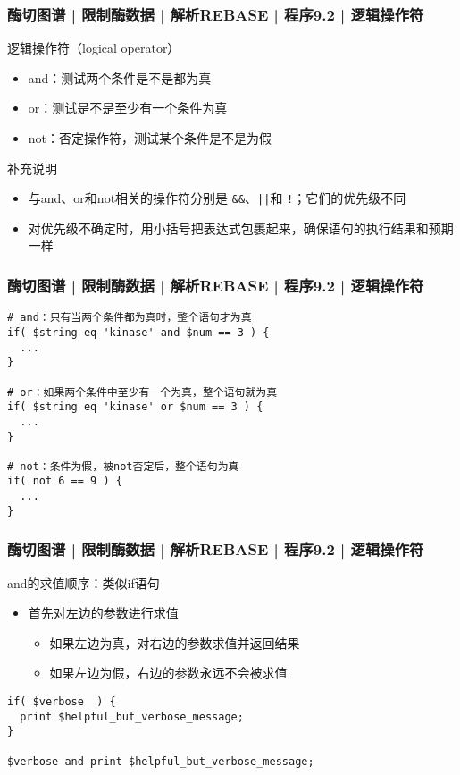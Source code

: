 \begin{frame}[fragile]
  \frametitle{酶切图谱 | 限制酶数据 | 解析REBASE | 程序9.2 | \alert{逻辑操作符}}
  \begin{block}{逻辑操作符（logical operator）}
    \begin{itemize}
      \item and：测试两个条件是不是都为真
      \item or：测试是不是至少有一个条件为真
      \item not：否定操作符，测试某个条件是不是为假
    \end{itemize}
  \end{block}
  \pause
  \begin{block}{补充说明}
    \begin{itemize}
      \item 与and、or和not相关的操作符分别是 \verb|&&|、\verb=||=和 \verb|!|；它们的优先级不同
      \item 对优先级不确定时，用小括号把表达式包裹起来，确保语句的执行结果和预期一样
    \end{itemize}
  \end{block}
\end{frame}

\begin{frame}[fragile]
  \frametitle{酶切图谱 | 限制酶数据 | 解析REBASE | 程序9.2 | \alert{逻辑操作符}}
\begin{lstlisting}
# and：只有当两个条件都为真时，整个语句才为真
if( $string eq 'kinase' and $num == 3 ) {
  ...
}

# or：如果两个条件中至少有一个为真，整个语句就为真
if( $string eq 'kinase' or $num == 3 ) {
  ...
}

# not：条件为假，被not否定后，整个语句为真
if( not 6 == 9 ) {
  ...
}
\end{lstlisting}
\end{frame}

\begin{frame}[fragile]
  \frametitle{酶切图谱 | 限制酶数据 | 解析REBASE | 程序9.2 | \alert{逻辑操作符}}
  \begin{block}{and的求值顺序：类似if语句}
    \begin{itemize}
      \item 首先对左边的参数进行求值
	\begin{itemize}
	  \item 如果左边为真，对右边的参数求值并返回结果
	  \item 如果左边为假，右边的参数永远不会被求值
	\end{itemize}
    \end{itemize}
  \end{block}
  \pause
\begin{lstlisting}
if( $verbose  ) {
  print $helpful_but_verbose_message;
}

$verbose and print $helpful_but_verbose_message;
\end{lstlisting}
\end{frame}

